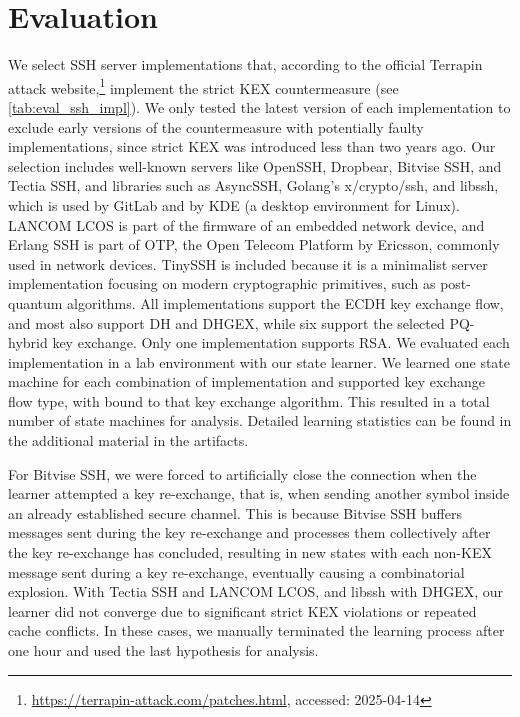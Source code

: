 \section{Evaluation}
\label{sec:eval}

We select \nrImplementations SSH server implementations that, according to the official Terrapin attack website,\footnote{\url{https://terrapin-attack.com/patches.html}, accessed: 2025-04-14} implement the strict KEX countermeasure (see \autoref{tab:eval_ssh_impl}). We only tested the latest version of each implementation to exclude early versions of the countermeasure with potentially faulty implementations, since strict KEX was introduced less than two years ago. Our selection includes well-known servers like OpenSSH, Dropbear, Bitvise SSH, and Tectia SSH, and libraries such as AsyncSSH, Golang's x/crypto/ssh, and libssh, which is used by GitLab and by KDE (a desktop environment for Linux). LANCOM LCOS is part of the firmware of an embedded network device, and Erlang SSH is part of OTP, the Open Telecom Platform by Ericsson, commonly used in network devices. TinySSH is included because it is a minimalist server implementation focusing on modern cryptographic primitives, such as post-quantum algorithms. All implementations support the ECDH key exchange flow, and most also support DH and DHGEX, while six support the selected PQ-hybrid key exchange. Only one implementation supports RSA. We evaluated each implementation in a lab environment with our state learner. We learned one state machine for each combination of implementation and supported key exchange flow type, with \msgkexinit bound to that key exchange algorithm. This resulted in a total number of \nrStateMachines state machines for analysis. Detailed learning statistics can be found in the additional material in the artifacts.

For Bitvise SSH, we were forced to artificially close the connection when the learner attempted a key re-exchange, that is, when sending another \msgkexinit symbol inside an already established secure channel. This is because Bitvise SSH buffers messages sent during the key re-exchange and processes them collectively after the key re-exchange has concluded, resulting in new states with each non-KEX message sent during a key re-exchange, eventually causing a combinatorial explosion. With Tectia SSH and LANCOM LCOS, and libssh with DHGEX, our learner did not converge due to significant strict KEX violations or repeated cache conflicts. In these cases, we manually terminated the learning process after one hour and used the last hypothesis for analysis.

